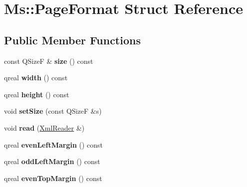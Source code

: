 \hypertarget{class_ms_1_1_page_format}{}\section{Ms\+:\+:Page\+Format Struct Reference}
\label{class_ms_1_1_page_format}
\subsection*{Public Member Functions}
\begin{DoxyCompactItemize}
\item 
\mbox{\label{class_ms_1_1_page_format_a7a23e8f4abbe0ed55c2c4e1fffdac8e9}} 
const Q\+SizeF \& {\bfseries size} () const
\item 
\mbox{\label{class_ms_1_1_page_format_aadd0d4f08401c4dc5083f716c242419c}} 
qreal {\bfseries width} () const
\item 
\mbox{\label{class_ms_1_1_page_format_af3c6557335ed59dda530c3a3828e36d3}} 
qreal {\bfseries height} () const
\item 
\mbox{\label{class_ms_1_1_page_format_aef3e3a8b77b9f4a3ad023179590233bd}} 
void {\bfseries set\+Size} (const Q\+SizeF \&s)
\item 
\mbox{\label{class_ms_1_1_page_format_a603b18850f937c0a8536fecec4a08aa2}} 
void {\bfseries read} (\hyperlink{class_ms_1_1_xml_reader}{Xml\+Reader} \&)
\item 
\mbox{\label{class_ms_1_1_page_format_aa319a8a043a6e1cd4095ecac26be08a8}} 
qreal {\bfseries even\+Left\+Margin} () const
\item 
\mbox{\label{class_ms_1_1_page_format_a8cb7caebb6d50a9c90a48e0bf0b9fbce}} 
qreal {\bfseries odd\+Left\+Margin} () const
\item 
\mbox{\label{class_ms_1_1_page_format_aeccfb6744a0fc95117140122743f2560}} 
qreal {\bfseries even\+Top\+Margin} () const
\item 
\mbox{\label{class_ms_1_1_page_format_aa5d7afab05ac07044fdb3606ac8545f8}} 

\end{DoxyCompactItemize}
